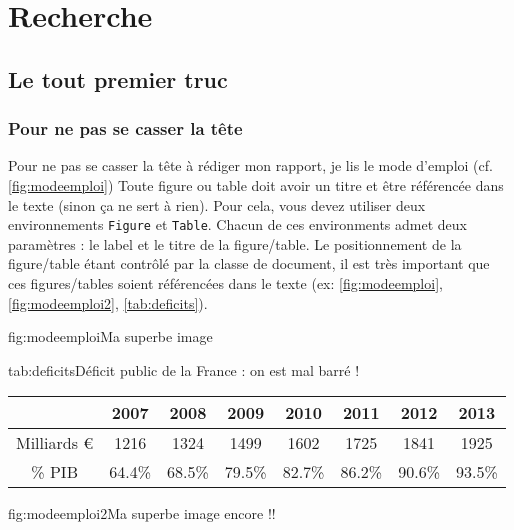 \documentclass[overfullbox]{polytech/polytech}
\begin{document}
\part{Recherche}
\label{part:part_recherche}

\chapter{Le tout premier truc}
\label{chap:toutpremier}

\lipsum[1]

\section{Pour ne pas se casser la tête}

\label{sec:cassetete}

Pour ne pas se casser la tête à rédiger mon rapport, je lis le mode d'emploi (cf. \ref{fig:modeemploi})
Toute figure ou table doit avoir un titre et être référencée dans le texte (sinon ça ne sert à rien).
Pour cela, vous devez utiliser deux environnements \texttt{Figure} et \texttt{Table}. Chacun de ces environments admet deux paramètres : le label et le titre de la figure/table. Le positionnement de la figure/table étant contrôlé par la classe de document, il est très important que ces figures/tables soient référencées dans le texte (ex: \autoref{fig:modeemploi}, \autoref{fig:modeemploi2}, \autoref{tab:deficits}).

\begin{Figure}{fig:modeemploi}{Ma superbe image}
\end{Figure}

\begin{Table}{tab:deficits}{Déficit public de la France : on est mal barré !}
\begin{tabu}{cccccccc}
	&2007	&2008	&2009	&2010	&2011	&2012	&2013\\\hline
Milliards \euro&1216	&1324	&1499	&1602	&1725	&1841	&1925\\\hline
\% PIB	&64.4\%	&68.5\%	&79.5\%	&82.7\%	&86.2\%	&90.6\%	&93.5\%\\\hline
\end{tabu}
\end{Table}

\begin{Figure}{fig:modeemploi2}{Ma superbe image encore !!}
\end{Figure}
\end{document}

